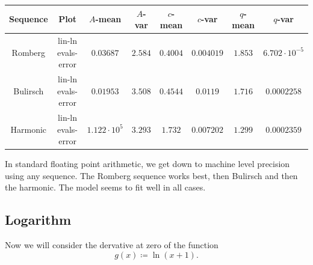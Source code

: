\begin{table}[H]
    \centering
    \small
    \begin{tabular}{c|c||c|c|c|c|c|c}
Sequence & Plot & \(A\)-mean & \(A\)-var & \(c\)-mean & \(c\)-var & \(q\)-mean & \(q\)-var\\\hline
\rowcolor{green}
Romberg & lin-ln evals-error & \(0.03687\) & \(2.584\) & \(0.4004\) & \(0.004019\) & \(1.853\) & \(6.702\cdot 10^{-5}\) \\
\rowcolor{green}
Bulirsch & lin-ln evals-error & \(0.01953\) & \(3.508\) & \(0.4544\) & \(0.0119\) & \(1.716\) & \(0.0002258\) \\
\rowcolor{green}
Harmonic & lin-ln evals-error & \(1.122\cdot 10^5\) & \(3.293\) & \(1.732\) & \(0.007202\) & \(1.299\) & \(0.0002359\) \\
    \end{tabular}
    \label{tab:my_label}
\end{table}

In standard floating point arithmetic, we get down to machine level precision using any sequence. The Romberg sequence works best, then Bulirsch and then the harmonic. The model seems to fit well in all cases.

\subsection{Logarithm}

Now we will consider the dervative at zero of the function 
\[
g(x) \coloneqq \ln(x+1).
\]

